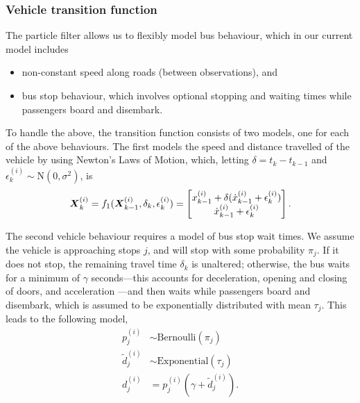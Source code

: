 \subsubsection{Vehicle transition function}
\label{sec:pf_prediction}

The particle filter allows us to flexibly model bus behaviour,
which in our current model includes
\begin{itemize}
\item non-constant speed along roads (between observations), and
\item bus stop behaviour, which involves optional stopping and waiting times
    while passengers board and disembark.
\end{itemize}
To handle the above, the transition function consists of two models,
one for each of the above behaviours.
The first models the speed and distance travelled of the vehicle 
by using Newton's Laws of Motion,
which, letting $\delta = t_k - t_{k-1}$ and $\epsilon_k^{(i)}\sim\mathrm{N}(0, \sigma^2)$, is
\begin{equation}
\label{eq:trans_newton}
\mbox{$\boldsymbol{X}$}_k^{(i)} = f_1(\mbox{$\boldsymbol{X}$}_{k-1}^{(i)}, \delta_k, \epsilon_k^{(i)}) = 
    \begin{bmatrix}
        x_{k-1}^{(i)} + \delta(\dot x_{k-1}^{(i)} + \epsilon_k^{(i)}) \\
        \dot x_{k-1}^{(i)} + \epsilon_k^{(i)}
    \end{bmatrix}.
\end{equation}

The second vehicle behaviour requires a model of bus stop wait times.
We assume the vehicle is approaching stops $j$,
and will stop with some probability $\pi_j$.
If it does not stop, the remaining travel time $\delta_k$ is unaltered;
otherwise, the bus waits for a minimum of $\gamma$ seconds---this 
accounts for deceleration, opening and closing of doors, and acceleration
\citep{Hands_2015}---and then waits while passengers board and disembark,
which is assumed to be exponentially distributed with mean $\tau_j$.
This leads to the following model,
\begin{equation}
\label{eq:trans_stop}
\begin{split}
p_j^{(i)} &\sim \mathrm{Bernoulli}(\pi_j) \\
\tilde d_j^{(i)} &\sim \mathrm{Exponential}(\tau_j) \\
d_j^{(i)} &= p_j^{(i)}(\gamma + \tilde d_j^{(i)}).
\end{split}
\end{equation}

